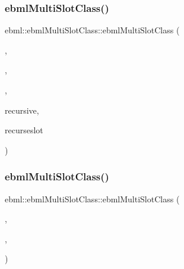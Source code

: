 \subsubsection{\texorpdfstring{ebml\+Multi\+Slot\+Class()}{ebmlMultiSlotClass()}\hspace{0.1cm}{\footnotesize\ttfamily [2/4]}}
{\footnotesize\ttfamily ebml\+::ebml\+Multi\+Slot\+Class\+::ebml\+Multi\+Slot\+Class (\begin{DoxyParamCaption}\item[{const char $\ast$}]{,  }\item[{const std\+::wstring \&}]{,  }\item[{const \mbox{\hyperlink{namespaceebml_abdc1248164e4e424423defac9fff7d4d}{slot\+Spec\+\_\+l}} \&}]{,  }\item[{const \mbox{\hyperlink{structebml_1_1occurSpec__t}{occur\+Spec\+\_\+t}} \&}]{recursive,  }\item[{size\+\_\+t}]{recurseslot }\end{DoxyParamCaption})}

\mbox{\label{classebml_1_1ebmlMultiSlotClass_ac96d2f773a6c8e18731732c97a783fe6}} 
\subsubsection{\texorpdfstring{ebml\+Multi\+Slot\+Class()}{ebmlMultiSlotClass()}\hspace{0.1cm}{\footnotesize\ttfamily [3/4]}}
{\footnotesize\ttfamily ebml\+::ebml\+Multi\+Slot\+Class\+::ebml\+Multi\+Slot\+Class (\begin{DoxyParamCaption}\item[{\mbox{\hyperlink{namespaceebml_a86c5f604ddf12a74aa9812e997a58691}{ebml\+I\+D\+\_\+t}}}]{,  }\item[{const std\+::wstring \&}]{,  }\item[{const \mbox{\hyperlink{namespaceebml_abdc1248164e4e424423defac9fff7d4d}{slot\+Spec\+\_\+l}} \&}]{ }\end{DoxyParamCaption})}

\mbox{\label{classebml_1_1ebmlMultiSlotClass_ac657dd7c6bd7a89928df88babbff9009}} 
